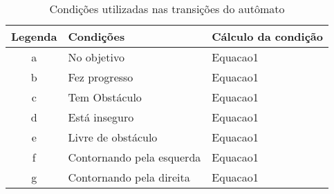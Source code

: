 \begin{table}[ht]
\centering
\caption{Condições utilizadas nas transições do autômato}
\vspace{0.2 cm}
\begin{tabular}{|c|l|l|}
\hline
Legenda & Condições                 & Cálculo da condição \\ \hline
a       & No objetivo               & Equacao1            \\ \hline
b       & Fez progresso             & Equacao1            \\ \hline
c       & Tem Obstáculo             & Equacao1            \\ \hline
d       & Está inseguro             & Equacao1            \\ \hline
e       & Livre de obstáculo        & Equacao1            \\ \hline
f       & Contornando pela esquerda & Equacao1            \\ \hline
g       & Contornando pela direita  & Equacao1            \\ \hline
\end{tabular}
\label{tab:automatoEventos}
\end{table}